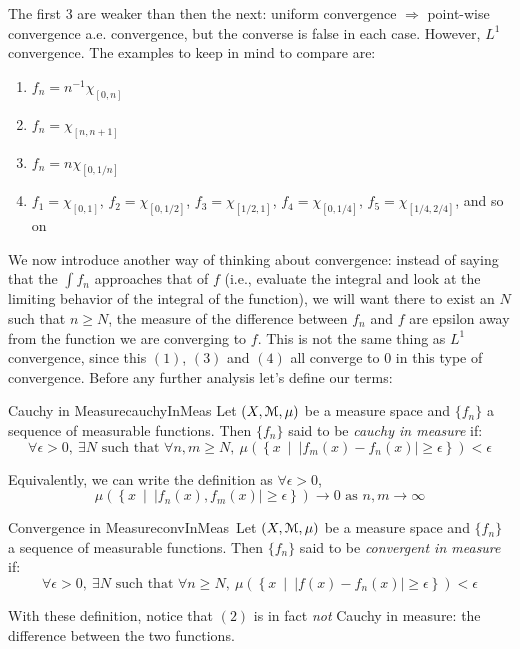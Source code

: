 \documentclass[oneside]{book}
\newcommand{\EM}{\EuScript{M}}
\newcommand{\set}[2]{\left\{#1 \ \middle|\ #2\right\}}
\newcommand{\rw}{\rightarrow}
\newcommand{\Rw}{\Rightarrow}
\begin{document}
The first 3 are weaker than then the next: uniform convergence $\Rw$ point-wise convergence \Rw a.e. convergence, but the
converse is false in each case. However, $L^1$ convergence. The examples to keep in mind to compare are:
\begin{enumerate}
	\item $f_n = n^{-1}\chi_{[0, n]}$
	\item $f_n = \chi_{[n, n+1]}$
	\item $f_n = n\chi_{[0, 1/n]}$
	\item $f_1 = \chi_{[0,1]}$, $f_2 = \chi_{[0,1/2]}$, $f_3 = \chi_{[1/2,1]}$, $f_4 = \chi_{[0,1/4]}$, $f_5
		= \chi_{[1/4,2/4]}$, and so on
\end{enumerate}

We now introduce another way of thinking about convergence: instead of saying that the $\int f_n$ approaches that of
$f$ (i.e., evaluate the integral and look at the limiting behavior of the integral of the function), we will want there
to exist an $N$ such that $n \ge N$, 
the measure of the difference between $f_n$ and $f$ are epsilon away from the function we are converging to $f$. This
is not the same thing as $L^1$ convergence, since this $(1)$, $(3)$ and $(4)$ all converge to $0$ in this type of
convergence. Before any further analysis let's define our terms:

\begin{defn}{Cauchy in Measure}{cauchyInMeas}
	Let $(X, \EM, \mu)$ be a measure space and $\{f_n\}$ a sequence of measurable functions. Then $\{f_n\}$ said to be
	\emph{cauchy in measure} if:
	\[
		\forall \epsilon > 0,\ \exists N\text{ such that } \forall n,m \ge N,\ \mu(\set{x}{|f_m(x)-f_n(x)| \ge \epsilon})
		< \epsilon
	\]
\end{defn}
Equivalently, we can write the definition as $\forall \epsilon > 0$, 
\[
	\mu(\set{x}{|f_n(x), f_m(x)| \ge \epsilon}) \rw 0 \text{ as } n,m \rw \infty
\]

\begin{defn}{Convergence in Measure}{convInMeas}\
	Let $(X, \EM, \mu)$ be a measure space and $\{f_n\}$ a sequence of measurable functions. Then $\{f_n\}$ said to be
	\emph{convergent in measure} if:
	\[
		\forall \epsilon > 0,\ \exists N\text{ such that } \forall n \ge N,\ \mu(\set{x}{|f(x)-f_n(x)| \ge \epsilon})
		< \epsilon
	\]
\end{defn}

With these definition, notice that $(2)$ is in fact \emph{not} Cauchy in measure: the difference between the two
functions. 
\end{document}
